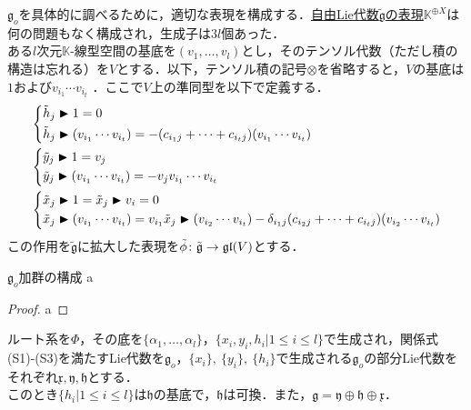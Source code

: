 \documentclass[rep_main]{subfiles}
\begin{document}
$\mathfrak{g}_o$を具体的に調べるために，適切な表現を構成する．\hyperref[def:free-Lie-alg-rep]{自由Lie代数$\tilde{\mathfrak{g}}$の表現}$\mathbb{K}^{\oplus X}$は何の問題もなく構成され，生成子は$3l$個あった．\\
ある$l$次元$\mathbb{K}$-線型空間の基底を$(v_1, \ldots , v_l)$とし，そのテンソル代数（ただし積の構造は忘れる）を$V$とする．以下，テンソル積の記号$\otimes$を省略すると，$V$の基底は$1$および$v_{i_1}\cdots v_{i_t}$
．ここで$V$上の準同型を以下で定義する．
\begin{align}
	&\left\{\begin{aligned}
		&\tilde{h}_j \blacktriangleright 1 = 0 \\
		&\tilde{h}_j \blacktriangleright (v_{i_1}\cdots v_{i_t}) = -(c_{i_1j} + \cdots + c_{i_tj})(v_{i_1}\cdots v_{i_t})
	\end{aligned}\right. \\
	&\left\{\begin{aligned}
		&\tilde{y}_j \blacktriangleright 1 = v_j \\
		&\tilde{y}_j \blacktriangleright (v_{i_1}\cdots v_{i_t}) = -v_jv_{i_1}\cdots v_{i_t}
	\end{aligned}\right. \\
	&\left\{\begin{aligned}
		&\tilde{x}_j \blacktriangleright 1 = \tilde{x}_j \blacktriangleright v_i = 0 \\
		&\tilde{x}_j \blacktriangleright (v_{i_1}\cdots v_{i_t}) = v_{i_1}\tilde{x}_j \blacktriangleright (v_{i_2}\cdots v_{i_t}) - \delta_{i_1j}(c_{i_2j} + \cdots + c_{i_tj})(v_{i_2}\cdots v_{i_t})
	\end{aligned}\right.
\end{align}
この作用を$\tilde{\mathfrak{g}}$に拡大した表現を$\tilde{\phi}\colon \tilde{\mathfrak{g}} \to \mathfrak{gl}(V)$とする．
\begin{myprop}[label=prop:]{$\mathfrak{g}_o$加群の構成}
	a
\end{myprop}
\begin{proof}
	a
\end{proof}
\begin{mytheo}[label=thm:]{}
	ルート系を$\Phi$，その底を$\{\alpha_1, \ldots, \alpha_l\}$，$\{x_i, y_i, h_i | 1 \leq i \leq l\}$で生成され，関係式(S1)-(S3)を満たすLie代数を$\mathfrak{g}_o$，$\{x_i\},\ \{y_i\},\ \{h_i\}$で生成される$\mathfrak{g}_o$の部分Lie代数をそれぞれ$\mathfrak{x}, \mathfrak{y}, \mathfrak{h}$とする．\\
	このとき$\{h_i | 1 \leq i \leq l\}$は$\mathfrak{h}$の基底で，$\mathfrak{h}$は可換．また，$\mathfrak{g} = \mathfrak{y} \oplus \mathfrak{h} \oplus \mathfrak{x}$．
\end{mytheo}
\end{document}

